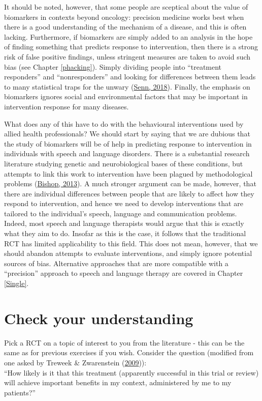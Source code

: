 \documentclass{krantz}
\begin{document}
It should be noted, however, that some people are sceptical about the value of biomarkers in contexts beyond oncology: precision medicine works best when there is a good understanding of the mechanism of a disease, and this is often lacking. Furthermore, if biomarkers are simply added to an analysis in the hope of finding something that predicts response to intervention, then there is a strong risk of false positive findings, unless stringent measures are taken to avoid such bias (see Chapter \ref{phacking}). Simply dividing people into ``treatment responders'' and ``nonresponders'' and looking for differences between them leads to many statistical traps for the unwary (\protect\hyperlink{ref-senn2018}{Senn, 2018}). Finally, the emphasis on biomarkers ignores social and environmental factors that may be important in intervention response for many diseases.

What does any of this have to do with the behavioural interventions used by allied health professionals? We should start by saying that we are dubious that the study of biomarkers will be of help in predicting response to intervention in individuals with speech and language disorders. There is a substantial research literature studying genetic and neurobiological bases of these conditions, but attempts to link this work to intervention have been plagued by methodological problems (\protect\hyperlink{ref-bishop2013a}{Bishop, 2013}). A much stronger argument can be made, however, that there are individual differences between people that are likely to affect how they respond to intervention, and hence we need to develop interventions that are tailored to the individual's speech, language and communication problems. Indeed, most speech and language therapists would argue that this is exactly what they aim to do. Insofar as this is the case, it follows that the traditional RCT has limited applicability to this field. This does not mean, however, that we should abandon attempts to evaluate interventions, and simply ignore potential sources of bias. Alternative approaches that are more compatible with a ``precision'' approach to speech and language therapy are covered in Chapter \ref{Single}.

\hypertarget{check-your-understanding-14}{%
\section{Check your understanding}\label{check-your-understanding-14}}

Pick a RCT on a topic of interest to you from the literature - this can be the same as for previous exercises if you wish. Consider the question (modified from one asked by Treweek \& Zwarenstein (\protect\hyperlink{ref-treweek2009}{2009})):\\
``How likely is it that this treatment (apparently successful in this trial or review) will achieve important benefits in my context, administered by me to my patients?''
\end{document}
